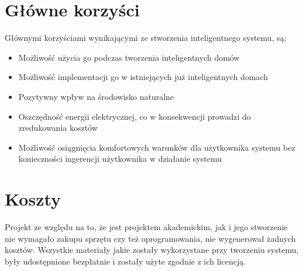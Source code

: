 \documentclass{article}
\begin{document}
\section{Główne korzyści}
Głównymi korzyściami wynikającymi ze stworzenia inteligentnego systemu, są:
\begin{itemize}
\item Możliwość użycia go podczas tworzenia inteligentnych domów
\item Możliwość implementacji go w istniejących już inteligentnych domach
\item Pozytywny wpływ na środowisko naturalne
\item Oszczędność energii elektrycznej, co w konsekwencji prowadzi do zredukowania kosztów
\item Możliwość osiągnięcia komfortowych warunków dla użytkownika systemu bez konieczności ingerencji użytkownika w działanie systemu
\end{itemize}

\section{Koszty}
Projekt ze względu na to, że jest projektem akademickim, jak i jego stworzenie nie wymagało zakupu sprzętu czy też oprogramowania, nie wygenerował żadnych kosztów. Wszystkie materiały jakie zostały wykorzystane przy tworzeniu systemu, były udostępnione bezpłatnie i zostały użyte zgodnie z ich licencją.
\end{document}
